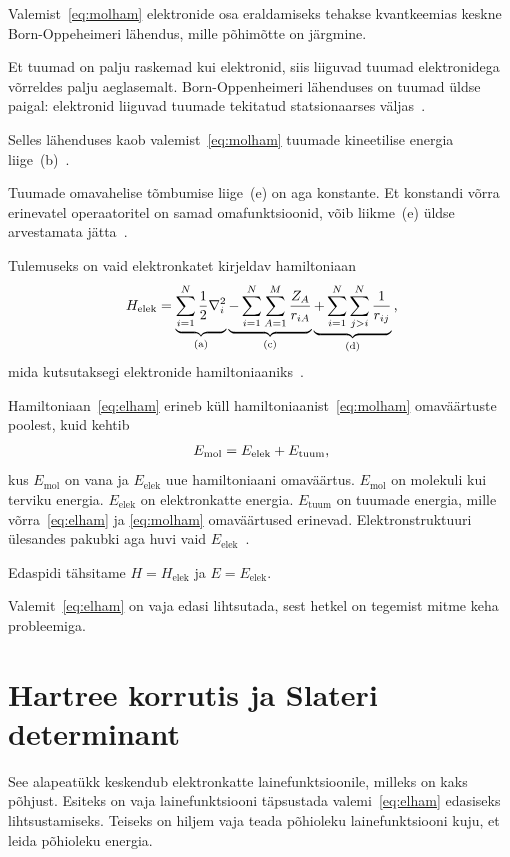\documentclass[12pt]{report}
\begin{document}
Valemist~\eqref{eq:molham} elektronide osa eraldamiseks tehakse kvantkeemias keskne Born-Oppeheimeri lähendus, mille põhimõtte on järgmine.

Et tuumad on palju raskemad kui elektronid, siis liiguvad tuumad elektronidega võrreldes palju aeglasemalt.
Born-Oppenheimeri lähenduses on tuumad üldse paigal: elektronid liiguvad tuumade tekitatud statsionaarses väljas~\cite{szabo+ostlund}.

Selles lähenduses kaob valemist~\eqref{eq:molham} tuumade kineetilise energia liige~(b)~\cite{szabo+ostlund}.

Tuumade omavahelise tõmbumise liige~(e) on aga konstante.
Et konstandi võrra erinevatel operaatoritel on samad omafunktsioonid, võib liikme~(e) üldse arvestamata jätta~\cite{szabo+ostlund}.

Tulemuseks on vaid elektronkatet kirjeldav hamiltoniaan
\begin{align}\label{eq:elham}
    H_\text{elek} = \underbrace{\sum_{i = 1}^N \frac{1}{2} \nabla_i^2}_\text{(a)}
    \underbrace{- \sum_{i = 1}^N \sum_{A = 1}^M \frac{Z_A}{r_{iA}}}_\text{(c)}
    \underbrace{+ \sum_{i = 1}^N \sum_{j > i}^N \frac{1}{r_{ij}}}_\text{(d)} \rlap{,}
\end{align}
mida kutsutaksegi elektronide hamiltoniaaniks~\cite{szabo+ostlund}.

Hamiltoniaan~\eqref{eq:elham} erineb küll hamiltoniaanist~\eqref{eq:molham} omaväärtuste poolest, kuid kehtib
\begin{align}
    E_\text{mol} = E_\text{elek} + E_\text{tuum} \rlap{,}
\end{align}
kus \(E_\text{mol}\) on vana ja \(E_\text{elek}\) uue hamiltoniaani omaväärtus.
\(E_\text{mol}\) on molekuli kui terviku energia.
\(E_\text{elek}\) on elektronkatte energia.
\(E_\text{tuum}\) on tuumade energia, mille võrra~\eqref{eq:elham} ja \eqref{eq:molham} omaväärtused erinevad.
Elektronstruktuuri ülesandes pakubki aga huvi vaid \(E_\text{elek}\)~\cite{szabo+ostlund}.

Edaspidi tähsitame \(H = H_\text{elek}\) ja \(E = E_\text{elek}\).

Valemit~\eqref{eq:elham} on vaja edasi lihtsutada, sest hetkel on tegemist mitme keha probleemiga.

\section{Hartree korrutis ja Slateri determinant}\label{sec:hpsd}

See alapeatükk keskendub elektronkatte lainefunktsioonile, milleks on kaks põhjust.
Esiteks on vaja lainefunktsiooni täpsustada valemi~\eqref{eq:elham} edasiseks lihtsustamiseks.
Teiseks on hiljem vaja teada põhioleku lainefunktsiooni kuju, et leida põhioleku energia.
\end{document}

